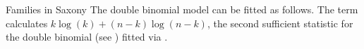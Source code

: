\documentclass[11pt]{book}
\renewenvironment{knitrout}{\small\renewcommand{\baselinestretch}{.85}}{} %
\begin{document}
\begin{Example}[saxony2]{Families in Saxony}
The double binomial model can be fitted as follows.
The term  calculates
$k \log(k) + (n-k) \log(n-k)$,
the second sufficient statistic for the double binomial
(see )
fitted via .

\begin{knitrout}
\color{fgcolor}\begin{kframe}
\begin{alltt}
\hlopt{$} \hlkwb{<-}
        \hlopt{*} \hlstd{(}\hlopt{==}\hlstd{,}  \hlopt{+}
        \hlstd{(}\hlopt{-} \hlopt{*} \hlstd{(}\hlstd{(}\hlopt{-}\hlopt{==}\hlstd{,} \hlstd{,} \hlopt{-}


\end{alltt}
\end{kframe}
\end{knitrout}
\end{Example}
\end{document}
